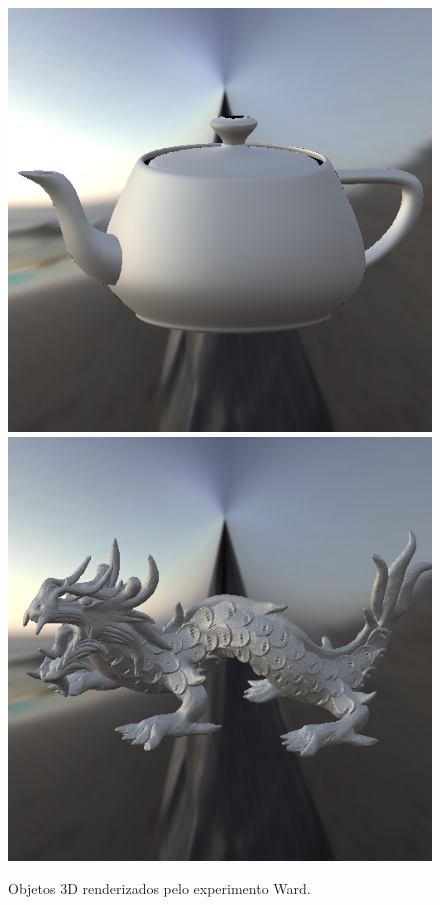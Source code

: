 \begin{figure}[H]
    \caption{\small{Objetos 3D renderizados pelo experimento Ward.}}\label{fig-ward-objetcs}
  \includegraphics[width=\linewidth]{./Imagens/brdfs/ward-teapot.png}
\endminipage\hfill
{}
  \includegraphics[width=\linewidth]{./Imagens/brdfs/ward-dragon.png}

\end{figure}
